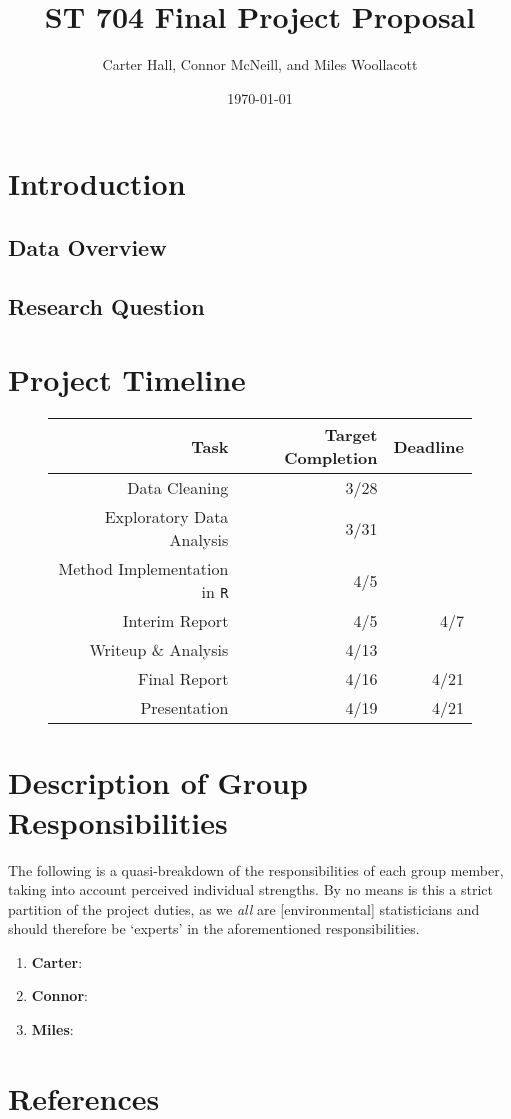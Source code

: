 \documentclass[11pt]{article}   	%
\title{{\bf{ST 704 Final Project Proposal}}}
\author{Carter Hall, Connor McNeill, and Miles Woollacott}
\date{\today}							%
\begin{document}
\maketitle

\section{Introduction}

\subsection*{Data Overview}

\subsection*{Research Question}

\textbf{}

\section{Project Timeline}

\begin{figure}[H]
\centering
\begin{tabular}{rrr}
\toprule
Task & Target Completion & Deadline \\
\midrule
Data Cleaning & 3/28 & \\
Exploratory Data Analysis & 3/31 & \\
Method Implementation in {\tt{R}} & 4/5 & \\
Interim Report & 4/5 & 4/7 \\
Writeup \& Analysis & 4/13 & \\
Final Report & 4/16 & 4/21 \\
Presentation & 4/19 & 4/21 \\
\bottomrule
\end{tabular}
\end{figure}

\section{Description of Group Responsibilities}

The following is a quasi-breakdown of the responsibilities of each group member, taking into account perceived individual strengths. By no means is this a strict partition of the project duties, as we \textit{all} are [environmental] statisticians and should therefore be `experts' in the aforementioned responsibilities.

\begin{enumerate}
    \item \textbf{Carter}:  
    \item \textbf{Connor}:
    \item \textbf{Miles}:
\end{enumerate}

\section{References}
\end{document}
